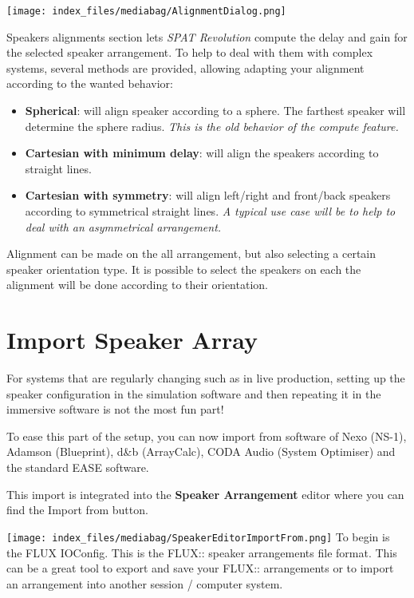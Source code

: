 \documentclass[
  letterpaper,
  DIV=11,
  numbers=noendperiod]{scrreport}
\providecommand{\tightlist}{%
  \setlength{\itemsep}{0pt}\setlength{\parskip}{0pt}}\usepackage{longtable,booktabs,array}
\begin{document}
\texttt{[image: index\_files/mediabag/AlignmentDialog.png]}

Speakers alignments section lets \emph{SPAT Revolution} compute the
delay and gain for the selected speaker arrangement. To help to deal
with them with complex systems, several methods are provided, allowing
adapting your alignment according to the wanted behavior:

\begin{itemize}
\tightlist
\item
  \textbf{Spherical}: will align speaker according to a sphere. The
  farthest speaker will determine the sphere radius. \emph{This is the
  old behavior of the compute feature.}
\item
  \textbf{Cartesian with minimum delay}: will align the speakers
  according to straight lines.
\item
  \textbf{Cartesian with symmetry}: will align left/right and front/back
  speakers according to symmetrical straight lines. \emph{A typical use
  case will be to help to deal with an asymmetrical arrangement.}
\end{itemize}

Alignment can be made on the all arrangement, but also selecting a
certain speaker orientation type. It is possible to select the speakers
on each the alignment will be done according to their orientation.

\hypertarget{import-speaker-array}{%
\chapter{Import Speaker Array}\label{import-speaker-array}}

For systems that are regularly changing such as in live production,
setting up the speaker configuration in the simulation software and then
repeating it in the immersive software is not the most fun part!

To ease this part of the setup, you can now import from software of Nexo
(NS-1), Adamson (Blueprint), d\&b (ArrayCalc), CODA Audio (System
Optimiser) and the standard EASE software.

This import is integrated into the \textbf{Speaker Arrangement} editor
where you can find the Import from button.

\texttt{[image: index\_files/mediabag/SpeakerEditorImportFrom.png]} To
begin is the FLUX IOConfig. This is the FLUX:: speaker arrangements file
format. This can be a great tool to export and save your FLUX::
arrangements or to import an arrangement into another session / computer
system.
\end{document}
